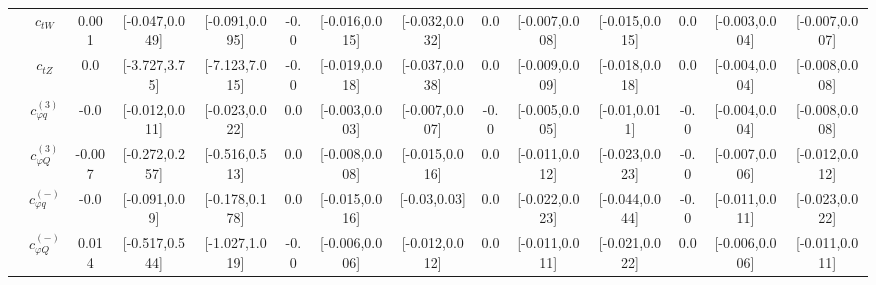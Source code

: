 \documentclass{article}
\begin{document}
\begin{table}[H]
\begin{tabular}{|c|c|c|c|c|c|c|c|c|c|c|c|c|c|}
 & $c_{tW}$ & 0.001                             & [-0.047,0.049]                                 & [-0.091,0.095] & -0.0                             & [-0.016,0.015]                                 & [-0.032,0.032] & 0.0                             & [-0.007,0.008]                                 & [-0.015,0.015] & 0.0                             & [-0.003,0.004]                                 & [-0.007,0.007] \\ \cline{2-14}
 & $c_{tZ}$ & 0.0                             & [-3.727,3.75]                                 & [-7.123,7.015] & -0.0                             & [-0.019,0.018]                                 & [-0.037,0.038] & 0.0                             & [-0.009,0.009]                                 & [-0.018,0.018] & 0.0                             & [-0.004,0.004]                                 & [-0.008,0.008] \\ \cline{2-14}
 & $c_{\varphi q}^{(3)}$ & -0.0                             & [-0.012,0.011]                                 & [-0.023,0.022] & 0.0                             & [-0.003,0.003]                                 & [-0.007,0.007] & -0.0                             & [-0.005,0.005]                                 & [-0.01,0.011] & -0.0                             & [-0.004,0.004]                                 & [-0.008,0.008] \\ \cline{2-14}
 & $c_{\varphi Q}^{(3)}$ & -0.007                             & [-0.272,0.257]                                 & [-0.516,0.513] & 0.0                             & [-0.008,0.008]                                 & [-0.015,0.016] & 0.0                             & [-0.011,0.012]                                 & [-0.023,0.023] & -0.0                             & [-0.007,0.006]                                 & [-0.012,0.012] \\ \cline{2-14}
 & $c_{\varphi q}^{(-)}$ & -0.0                             & [-0.091,0.09]                                 & [-0.178,0.178] & 0.0                             & [-0.015,0.016]                                 & [-0.03,0.03] & 0.0                             & [-0.022,0.023]                                 & [-0.044,0.044] & -0.0                             & [-0.011,0.011]                                 & [-0.023,0.022] \\ \cline{2-14}
 & $c_{\varphi Q}^{(-)}$ & 0.014                             & [-0.517,0.544]                                 & [-1.027,1.019] & -0.0                             & [-0.006,0.006]                                 & [-0.012,0.012] & 0.0                             & [-0.011,0.011]                                 & [-0.021,0.022] & 0.0                             & [-0.006,0.006]                                 & [-0.011,0.011] \\ \cline{2-14}

\end{tabular}
\end{table}
\end{document}
